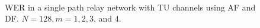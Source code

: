 \begin{figure}
{	 \\
}
\caption{WER in a single path relay network with TU channels using AF and DF.  $N = 128, m = 1, 2, 3$, and $4$.}
\label{fig:sp_af_df_wer_plots_TU}
\end{figure}

